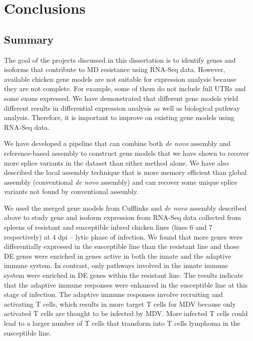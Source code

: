 \chapter{Conclusions}
\section{Summary}

The goal of the projects discussed in this dissertation is
to identify genes and isoforms that contribute to MD
resistance using RNA-Seq data. However, available chicken
gene models are not suitable for expression analysis because
they are not complete. For example, some of them do not
include full UTRs and some exons expressed. We have
demonstrated that different gene models yield different results
in differential expression analysis as well as biological
pathway analysis. Therefore, it is important to improve on
existing gene models using RNA-Seq data.

We have developed a pipeline that can combine both {\em de
novo} assembly and reference-based assembly to construct
gene models that we have shown to recover more splice
variants in the dataset than either method alone. We have
also described the local assembly technique that is more
memory efficient than global assembly (conventional {\em
de novo} assembly) and can recover some unique splice
variants not found by conventional assembly.

We used the merged gene models from Cufflinks and {\em de
novo} assembly described above to study gene and isoform expression
from RNA-Seq data collected from spleens of resistant and
susceptible inbred chicken lines (lines 6 and 7
respectively) at 4 dpi -- lytic phase of infection. We found
that more genes were differentially expressed in the
susceptible line than the resistant line and those DE genes were
enriched in genes active in both the innate and the adaptive immune system.
In contrast, only pathways involved in the innate immune
system were enriched in DE genes within the resistant line.
The results indicate that the adaptive immune responses were enhanced in the
susceptible line at this stage of infection. The adaptive
immune responses involve recruiting and activating T cells,
which results in more target T cells for MDV because only
activated T cells are thought to be infected by MDV.  More
infected T cells could lead to a larger number of T cells
that transform into T cells lymphoma in the susceptible line.

